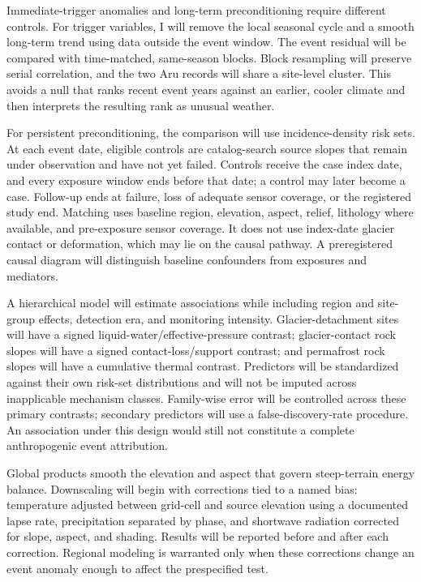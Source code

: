 \documentclass[11pt]{article}
\begin{document}
Immediate-trigger anomalies and long-term preconditioning require different
controls. For trigger variables, I will remove the local seasonal cycle and a
smooth long-term trend using data outside the event window. The event residual
will be compared with time-matched, same-season blocks. Block resampling will
preserve serial correlation, and the two Aru records will share a site-level
cluster. This avoids a null that ranks recent event years against an earlier,
cooler climate and then interprets the resulting rank as unusual weather.

For persistent preconditioning, the comparison will use incidence-density
risk sets. At each event date, eligible controls are catalog-search source
slopes that remain under observation and have not yet failed. Controls receive
the case index date, and every exposure window ends before that date; a control
may later become a case. Follow-up ends at failure, loss of adequate sensor
coverage, or the registered study end. Matching uses baseline region,
elevation, aspect, relief, lithology where available, and pre-exposure sensor
coverage. It does not use index-date glacier contact or deformation, which may
lie on the causal pathway. A preregistered causal diagram will distinguish
baseline confounders from exposures and mediators.

A hierarchical model will estimate associations while including region and
site-group effects, detection era, and monitoring intensity.
Glacier-detachment sites will have a signed liquid-water/effective-pressure contrast;
glacier-contact rock slopes will have a signed contact-loss/support contrast;
and permafrost rock slopes will have a cumulative thermal contrast. Predictors
will be standardized against their own risk-set distributions and will not be
imputed across inapplicable mechanism classes. Family-wise error will be
controlled across these primary contrasts; secondary predictors will use a
false-discovery-rate procedure. An association under this design would still
not constitute a complete anthropogenic event attribution.

Global products smooth the elevation and aspect that govern steep-terrain
energy balance. Downscaling will begin with corrections tied to a named bias:
temperature adjusted between grid-cell and source elevation using a documented
lapse rate, precipitation separated by phase, and shortwave radiation
corrected for slope, aspect, and shading. Results will be reported before and
after each correction. Regional modeling is warranted only when these
corrections change an event anomaly enough to affect the prespecified test.
\end{document}

